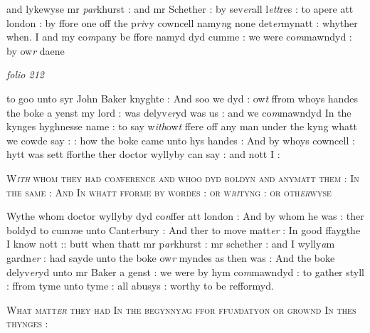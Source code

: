 \documentclass[12pt, a4paper]{book}
\begin{document}
and lykewyse mr \textit{par}khurst : and mr Schether : by sev\textit{er}all 
l\textit{ett}res : to apere att london : by ffore one off the p\textit{ri}vy cowncell
namy\textit{n}g none det\textit{er}mynatt : whyther when. I and my co\textit{m}pany
		be ffore namyd dyd cumme : we were co\textit{m}mawndyd : by ow\textit{r} daene



\dotfill
						\newpage
{}

\textit{folio 212}



 	
		
		\ifthenelse{\isodd{\thepage}}
		{\reversemarginpar}
		{\normalmarginpar}
		to goo unto syr John Baker knyghte : And soo we dyd : ow\textit{t} ffrom whoys
handes the boke a yenst my lord : was delyv\textit{er}yd was us : and we
co\textit{m}mawndyd In the kynges hyghnesse name : to say w\textit{ith}ow\textit{t} ffere off
any man under the kyng whatt we cowde say : : how the boke
came unto hys handes : And by whoys cowncell : hytt was 
sett fforthe ther doctor wyllyby can say : and nott I :
 	
 	
				\begin{center} \begin{large} {\scshape W\textit{ith} whom they had co\textit{n}ference and
whoo dyd boldyn and anymatt
them : In the same : And In whatt
fforme by wordes : or w\textit{ri}tyng : or oth\textit{er}wyse} \end{large} \end{center}
			
 	

		\ifthenelse{\isodd{\thepage}}
		{\reversemarginpar}
		{\normalmarginpar}
		Wythe whom doctor wyllyby dyd co\textit{n}ffer att london : And by whom he 
was : ther boldyd to cum\textit{m}e unto Cant\textit{er}bury : And ther to move matt\textit{er} :
In good ffaygthe I know nott :: butt when thatt mr p\textit{ar}khurst : mr
schether : and I wylly\textit{a}m gardn\textit{er}
 : had sayde unto the boke ow\textit{r} myndes
as then was : And the boke delyv\textit{er}yd unto mr Baker a genst :
we were by hym co\textit{m}mawndyd : to gather styll : ffrom tyme unto
tyme : all abusys : worthy to be refformyd.

				\begin{center} \begin{large} {\scshape What matt\textit{er} they had In the begynny\textit{n}g
ffor ffu\textit{n}datyon or grownd In thes thynges :} \end{large} \end{center}
			
\end{document}
